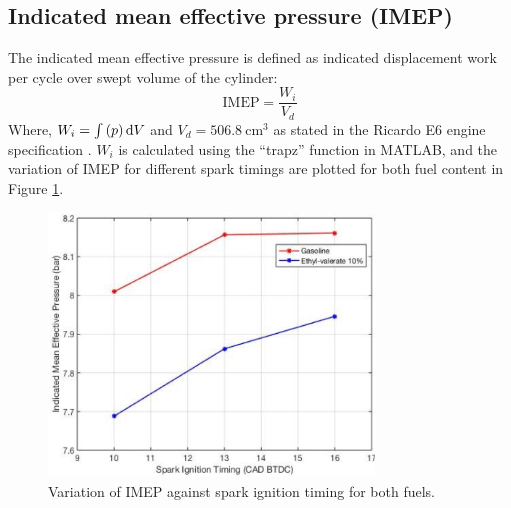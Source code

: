 \documentclass[11pt]{article}
\begin{document}
\subsection*{Indicated mean effective pressure (IMEP)}
The indicated mean effective pressure is defined as indicated displacement work per cycle over swept volume of the cylinder: 
\begin{equation}
    \textrm{IMEP} = \frac{W_i}{V_d}
\end{equation}
Where, 
$W_i = \int \left(p\right)\dif V$ and $V_d = \SI{506.8}{\centi\meter\cubed}$ as stated in the Ricardo E6 engine specification \cite{r0}. $W_i$ is calculated using the “trapz” function in MATLAB, and the variation of IMEP for different spark timings are plotted for both fuel content in Figure \ref{q1-f5}. 
\begin{figure}[H]
    \centering
    \includegraphics[height = 7cm]{./img/diagram12.png}
    \caption{Variation of IMEP against spark ignition timing for both fuels.}
    \label{q1-f5}
\end{figure}
\end{document}
